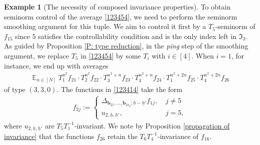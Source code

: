 \documentclass[11pt]{amsart}
\theoremstyle{definition}
\newtheorem{example}{Example}
\newcommand{\FI}{{\mathfrak I}}
\renewcommand{\b}{{\textbf{b}}}
\newcommand{\uh}{{\underline{h}}}
\newcommand{\inv}{^{-1}}
\DeclareMathOperator*{\E}{\mathbb{E}}
\begin{document}
\begin{example}[The necessity of composed invariance properties]
To obtain seminorm control of the average \eqref{123454}, we need to perform the seminorm smoothing argument for this tuple. We aim to control it first by a $T_5$-seminorm of $f_{15}$ since $5$ satisfies the controllability condition and is the only index left in $\FI_3$. As guided by Proposition \ref{P: type reduction}, in the \textit{ping} step of the smoothing argument, we replace $T_5$ in \eqref{123454} by some $T_i$ with $i\in[4]$. When $i=1$, for instance, we end up with averages
\begin{align}\label{123414}
    \E_{n\in[N]}T_1^{n^2}f_{21} \cdot T_2^{n^2}f_{22}\cdot T_3^{n^2+n}f_{23}\cdot T_4^{n^2+n}f_{24} \cdot T_1^{n^2+2n}f_{25}\cdot T_4^{n^2+2n}f_{26}
\end{align}
of type $(3, 3, 0)$. The functions in \eqref{123414} take the form
\begin{align*}
    f_{2j} := \begin{cases}
    \Delta_{\b_{21}, \ldots, \b_{2s_2}; \uh-\uh'}f_{1j},\; & j \neq 5\\
    u_{2,\uh, \uh'},\; &j=5,
    \end{cases}
\end{align*}
where $u_{2, \uh, \uh'}$ are $T_5 T_1\inv$-invariant. We note by Proposition \ref{propagation of invariance} that the functions $f_{26}$ retain the $T_6 T_4\inv$-invariance of $f_{16}$.


\end{example}
\end{document}
